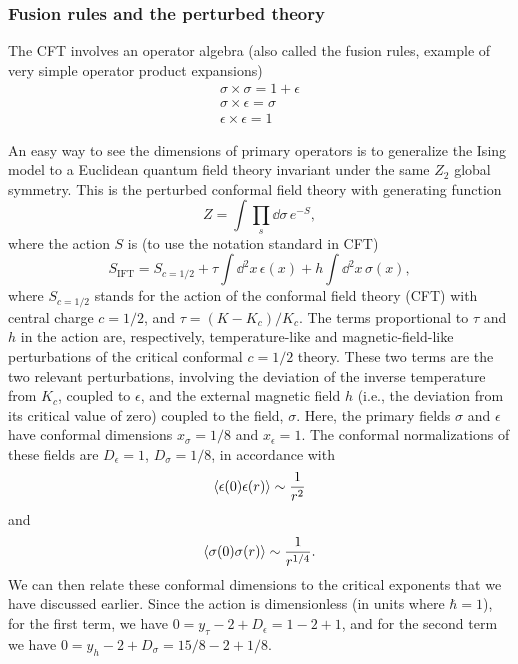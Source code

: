 \subsubsection*{Fusion rules and the perturbed theory}

The CFT involves an operator algebra (also called the fusion rules, example of very simple operator product
expansions)
\begin{gather}
  \sigma\times\sigma = 1+\epsilon \\
  \sigma\times\epsilon = \sigma \\
  \epsilon\times\epsilon = 1
\end{gather}

An easy way to see the dimensions of primary operators is to generalize the Ising model to a Euclidean quantum field
theory invariant under the same $Z_2$ global symmetry. This is the perturbed conformal field theory with generating
function
\begin{equation}
  Z = \int\prod_s\dd\sigma\,e^{-S} ,
\end{equation}
where the action $S$ is (to use the notation standard in CFT)
\begin{equation}
  S_{\mathrm{IFT}} = S_{c=1/2} + \tau\int\dd^2x\,\epsilon(x) + h\int\dd^2x\,\sigma(x) ,
\end{equation}
where $S_{c=1/2}$ stands for the action of the conformal field theory (CFT) with central charge $c = 1/2$, and
$\tau = (K-K_c)/K_c$. The terms proportional to $\tau$ and $h$ in the action are, respectively, temperature-like and
magnetic-field-like perturbations of the critical conformal $c = 1/2$ theory. These two terms are the two relevant
perturbations, involving the deviation of the inverse temperature from $K_c$, coupled to $\epsilon$, and the external
magnetic field $h$ (i.e., the deviation from its critical value of zero) coupled to the field, $\sigma$. Here, the
primary fields $\sigma$ and $\epsilon$ have conformal dimensions $x_\sigma = 1/8$ and $x_\epsilon = 1$. The conformal
normalizations of these fields are $D_\epsilon = 1$, $D_\sigma = 1/8$, in accordance with
\begin{equation}
  \langle \epsilon(0)\epsilon(r)\rangle \sim \frac{1}{r^2}
\end{equation}
and
\begin{equation}
  \langle \sigma(0)\sigma(r)\rangle \sim \frac{1}{r^{1/4}} .
\end{equation}
We can then relate these conformal dimensions to the critical exponents that we have discussed earlier. Since the
action is dimensionless (in units where $\hbar = 1$), for the first term, we have
$0 = y_\tau-2+D_\epsilon = 1-2+1$, and for the second term we have $0 = y_h-2+D_\sigma = 15/8-2+1/8$.

